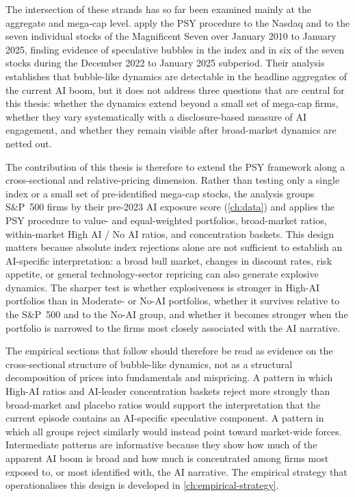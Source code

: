 The intersection of these strands has so far been examined mainly at the aggregate and mega-cap level. \citet{baselePhillipsShi2025} apply the PSY procedure to the Nasdaq and to the seven individual stocks of the Magnificent Seven over January 2010 to January 2025, finding evidence of speculative bubbles in the index and in six of the seven stocks during the December 2022 to January 2025 subperiod. Their analysis establishes that bubble-like dynamics are detectable in the headline aggregates of the current AI boom, but it does not address three questions that are central for this thesis: whether the dynamics extend beyond a small set of mega-cap firms, whether they vary systematically with a disclosure-based measure of AI engagement, and whether they remain visible after broad-market dynamics are netted out.

The contribution of this thesis is therefore to extend the PSY framework along a cross-sectional and relative-pricing dimension. Rather than testing only a single index or a small set of pre-identified mega-cap stocks, the analysis groups S\&P~500 firms by their pre-2023 AI exposure score (\cref{ch:data}) and applies the PSY procedure to value- and equal-weighted portfolios, broad-market ratios, within-market High AI / No AI ratios, and concentration baskets. This design matters because absolute index rejections alone are not sufficient to establish an AI-specific interpretation: a broad bull market, changes in discount rates, risk appetite, or general technology-sector repricing can also generate explosive dynamics. The sharper test is whether explosiveness is stronger in High-AI portfolios than in Moderate- or No-AI portfolios, whether it survives relative to the S\&P~500 and to the No-AI group, and whether it becomes stronger when the portfolio is narrowed to the firms most closely associated with the AI narrative.

The empirical sections that follow should therefore be read as evidence on the cross-sectional structure of bubble-like dynamics, not as a structural decomposition of prices into fundamentals and mispricing. A pattern in which High-AI ratios and AI-leader concentration baskets reject more strongly than broad-market and placebo ratios would support the interpretation that the current episode contains an AI-specific speculative component. A pattern in which all groups reject similarly would instead point toward market-wide forces. Intermediate patterns are informative because they show how much of the apparent AI boom is broad and how much is concentrated among firms most exposed to, or most identified with, the AI narrative. The empirical strategy that operationalises this design is developed in \cref{ch:empirical-strategy}.
